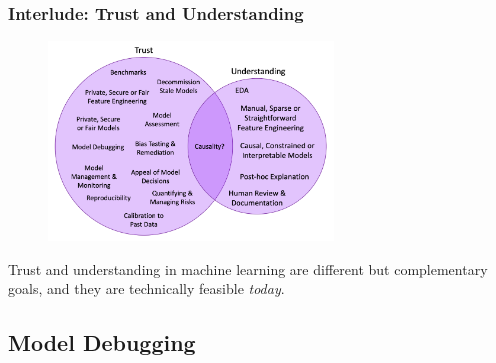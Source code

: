 \documentclass[11pt,
               aspectratio=169,
               hyperref={colorlinks}
               ]{beamer}
\begin{document}
			\begin{frame}[t]

  				\frametitle{Interlude: Trust and Understanding}
          
  				\begin{figure}[htb]
    					\begin{center}
      						\includegraphics[height=150pt]{img/trust_understanding.png}
    					\end{center}
  				\end{figure}
  
  				\vspace{-5pt}
  				\scriptsize{Trust and understanding in machine learning are different but complementary goals, and they are technically feasible \textit{today}}.
    
		\end{frame}

		\subsection{Model Debugging}
\end{document}
